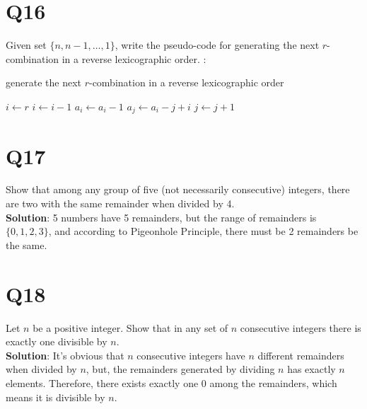\documentclass[a4paper,11pt]{article}
\newenvironment{solution}{{\\\bf Solution}:}{\smallskip}
\begin{document}
\section*{Q16}
Given set $\{ n,n-1, \ldots ,1 \}$, write the pseudo-code for generating the next $r$-combination in a reverse lexicographic order.
\begin{solution}
    \begin{algorithm}
        \caption{generate the next $r$-combination in a reverse
        lexicographic order}
        \begin{algorithmic}
            \State $i\gets r$
                \State $i\gets i-1$
            \EndWhile
            \State $a_{i}\gets a_{i}-1$
            \State $a_{j}\gets a_{i}-j+i$
            \State $j\gets j+1$
            \EndFor
        \EndProcedure
        \end{algorithmic}
    \end{algorithm}
\end{solution}

\section*{Q17}
Show that among any group of ﬁve (not necessarily consecutive) integers, there are two with the same remainder when divided by 4.
\begin{solution}
    5 numbers have 5 remainders, but the range of remainders is 
    $\{ 0,1,2,3 \}$, and according to Pigeonhole Principle, there 
    must be 2 remainders be the same.
\end{solution}

\section*{Q18}
Let $n$ be a positive integer. Show that in any set of $n$ consecutive integers there is exactly one divisible by $n$.
\begin{solution}
    It's obvious that $n$ consecutive integers have $n$ different
    remainders when divided by $n$, but, the remainders generated 
    by dividing $n$ has exactly $n$ elements. Therefore, there exists
    exactly one 0 among the remainders, 
    which means it is divisible by $n$.
\end{solution}
\end{document}
